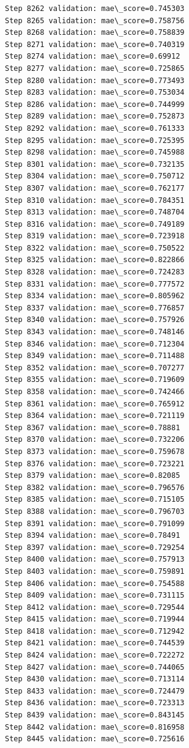 \documentclass[11pt]{article}
\begin{document}
\begin{Verbatim}[commandchars=\\\{\}]
Step 8262 validation: mae\_score=0.745303
Step 8265 validation: mae\_score=0.758756
Step 8268 validation: mae\_score=0.758839
Step 8271 validation: mae\_score=0.740319
Step 8274 validation: mae\_score=0.69912
Step 8277 validation: mae\_score=0.725865
Step 8280 validation: mae\_score=0.773493
Step 8283 validation: mae\_score=0.753034
Step 8286 validation: mae\_score=0.744999
Step 8289 validation: mae\_score=0.752873
Step 8292 validation: mae\_score=0.761333
Step 8295 validation: mae\_score=0.725395
Step 8298 validation: mae\_score=0.745988
Step 8301 validation: mae\_score=0.732135
Step 8304 validation: mae\_score=0.750712
Step 8307 validation: mae\_score=0.762177
Step 8310 validation: mae\_score=0.784351
Step 8313 validation: mae\_score=0.748704
Step 8316 validation: mae\_score=0.749189
Step 8319 validation: mae\_score=0.723918
Step 8322 validation: mae\_score=0.750522
Step 8325 validation: mae\_score=0.822866
Step 8328 validation: mae\_score=0.724283
Step 8331 validation: mae\_score=0.777572
Step 8334 validation: mae\_score=0.805962
Step 8337 validation: mae\_score=0.776857
Step 8340 validation: mae\_score=0.757926
Step 8343 validation: mae\_score=0.748146
Step 8346 validation: mae\_score=0.712304
Step 8349 validation: mae\_score=0.711488
Step 8352 validation: mae\_score=0.707277
Step 8355 validation: mae\_score=0.719609
Step 8358 validation: mae\_score=0.742466
Step 8361 validation: mae\_score=0.765912
Step 8364 validation: mae\_score=0.721119
Step 8367 validation: mae\_score=0.78881
Step 8370 validation: mae\_score=0.732206
Step 8373 validation: mae\_score=0.759678
Step 8376 validation: mae\_score=0.723221
Step 8379 validation: mae\_score=0.82085
Step 8382 validation: mae\_score=0.796576
Step 8385 validation: mae\_score=0.715105
Step 8388 validation: mae\_score=0.796703
Step 8391 validation: mae\_score=0.791099
Step 8394 validation: mae\_score=0.78491
Step 8397 validation: mae\_score=0.729254
Step 8400 validation: mae\_score=0.757913
Step 8403 validation: mae\_score=0.759891
Step 8406 validation: mae\_score=0.754588
Step 8409 validation: mae\_score=0.731115
Step 8412 validation: mae\_score=0.729544
Step 8415 validation: mae\_score=0.719944
Step 8418 validation: mae\_score=0.712942
Step 8421 validation: mae\_score=0.744539
Step 8424 validation: mae\_score=0.722272
Step 8427 validation: mae\_score=0.744065
Step 8430 validation: mae\_score=0.713114
Step 8433 validation: mae\_score=0.724479
Step 8436 validation: mae\_score=0.723313
Step 8439 validation: mae\_score=0.843145
Step 8442 validation: mae\_score=0.816958
Step 8445 validation: mae\_score=0.725616

\end{Verbatim}
\end{document}
